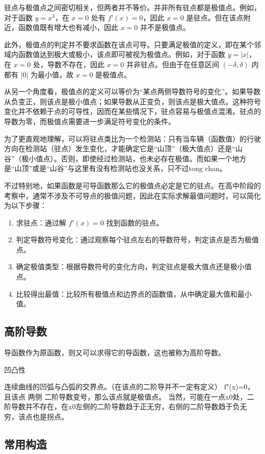 驻点与极值点之间密切相关，但两者并不等价。并非所有驻点都是极值点。例如，对于函数 $y = x^3$，在 $x = 0$ 处有 $f’(x) = 0$，因此 $x = 0$ 是驻点。但在该点附近，函数值既有增大也有减小，因此 $x = 0$ 并不是极值点。

此外，极值点的判定并不要求函数在该点可导。只要满足极值的定义，即在某个邻域内函数值达到极大或极小，该点即可被视为极值点。例如，对于函数 $y = |x|$，在 $x = 0$ 处，导数不存在，因此 $x = 0$ 并非驻点。但由于在任意区间 $(-\delta, \delta)$ 内都有 $|0|$ 为最小值，故 $x = 0$ 是极值点。

从另一个角度看，极值点的定义可以等价为“某点两侧导数符号的变化”。如果导数从负变正，则该点是极小值点；如果导数从正变负，则该点是极大值点。这种符号变化并不依赖于点的可导性，因而在某些情况下，驻点容易与极值点混淆。驻点的导数为零，而极值点需要进一步满足符号变化的条件。

为了更直观地理解，可以将驻点类比为一个检测站：只有当车辆（函数值）的行驶方向在检测站（驻点）发生变化，才能确定它是“山顶”（极大值点）还是“山谷”（极小值点）。否则，即使经过检测站，也未必存在极值。而如果一个地方是“山顶”或是“山谷”与这里有没有检测站也没关系，只不过tong chan。

不过特别地，如果函数是可导函数那么它的极值点必定是它的驻点。在高中阶段的考察中，通常不涉及不可导点的极值问题，因此在实际求解最值问题时，可以简化为以下步骤：
\begin{enumerate}
\item 求驻点：通过解 $f'(x) = 0$ 找到函数的驻点。
\item 判定导数符号变化：通过观察每个驻点左右的导数符号，判定该点是否为极值点。
\item 确定极值类型：根据导数符号的变化方向，判定驻点是极大值点还是极小值点。
\item 比较得出最值：比较所有极值点和边界点的函数值，从中确定最大值和最小值。
\end{enumerate}


\subsection{高阶导数}

导函数作为原函数，则又可以求得它的导函数，这也被称为高阶导数。

凹凸性

连续曲线的凹弧与凸弧的交界点。（在该点的二阶导并不一定有定义）
f"(x)=0，且该点 两侧 二阶导数变号，那么该点就是极值点。
当然，可能在一点x0处，二阶导数并不存在，在x0左侧的二阶导数趋于正无穷，右侧的二阶导数趋于负无穷，该点也是拐点。

\subsection{常用构造}

